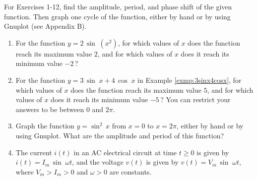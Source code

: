 \startexercises\label{sec5dot2}
\vspace{5mm}
{\small
\par\noindent For Exercises 1-12, find the amplitude, period, and phase shift of the given function.
Then graph one cycle of the function, either by hand or by using Gnuplot (see Appendix B).
\begin{enumerate}[\bfseries 1.]
 \item For the function $y=2\,\sin\;( x^2 )$, for which values of $x$
  does the function reach its maximum value $2$, and for which values of $x$ does it reach
  its minimum value $-2\,$?
 \item For the function $y=3\,\sin\;x + 4\,\cos\;x$ in Example \ref{exmp:3sinx4cosx}, for which
  values of $x$ does the function reach its maximum value $5$, and for which values of $x$ does it
  reach its minimum value $-5\,$? You can restrict your answers to be between $0$ and $2\pi$.
 \item Graph the function $y=\sin^2 \,x$ from $x=0$ to $x=2\pi$, either by hand or by using Gnuplot.
  What are the amplitude and period of this function?
 \item\label{exer:circuitphase}
  The current $i(t)$ in an AC electrical circuit at time $t\ge 0$ is given by
  $i(t) = I_m \,\sin\;\omega t$, and the voltage $v(t)$ is given by $v(t) = V_m \,\sin\;\omega t$,
  where $V_m > I_m > 0$ and $\omega > 0$ are constants.

\end{enumerate}}
